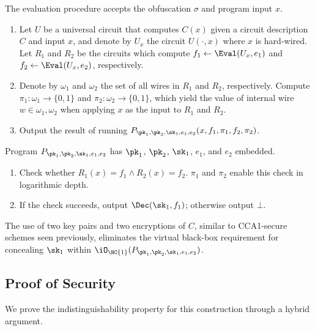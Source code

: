 The evaluation procedure accepts the obfuscation $\sigma$ and program
input $x$.
\begin{enumerate}
\item
	Let $U$ be a universal circuit that computes $C(x)$ given a
	circuit description $C$ and input $x$, and denote by $U_x$ the
	circuit $U(\cdot, x)$ where $x$ is hard-wired.
	Let $R_1$ and $R_2$ be the circuits which compute
	$f_1 \gets \Eval(U_x, e_1)$ and $f_2 \gets \Eval(U_x, e_2)$,
	respectively.

\item
	Denote by $\omega_1$ and $\omega_2$ the set of all wires in $R_1$
	and $R_2$, respectively.
	Compute $\pi_1 : \omega_1 \to \{ 0, 1 \}$ and
	$\pi_2 : \omega_2 \to \{ 0, 1 \}$, which yield the value of internal
	wire $w \in \omega_1, \omega_2$ when applying $x$ as the input
	to $R_1$ and $R_2$.

\item
	Output the result of running $\prog{1}(x, f_1, \pi_1, f_2, \pi_2)$.
\end{enumerate}

Program $\prog{1}$ has $\pk_1$, $\pk_2$, $\sk_1$, $e_1$, and $e_2$
embedded.
\begin{enumerate}
\item
	Check whether $R_1(x) = f_1 \land R_2(x) = f_2$.
	$\pi_1$ and $\pi_2$ enable this check in logarithmic depth.
\item
	If the check succeeds, output $\Dec(\sk_1, f_1)$;
	otherwise output $\bot$.
\end{enumerate}

The use of two key pairs and two encryptions of $C$, similar to
CCA1-secure schemes seen previously, eliminates the virtual black-box
requirement for concealing $\sk_1$ within $\iO_{\NC{1}}(\prog{1})$.

\subsection{Proof of Security}

We prove the indistinguishability property for this construction
through a hybrid argument.

